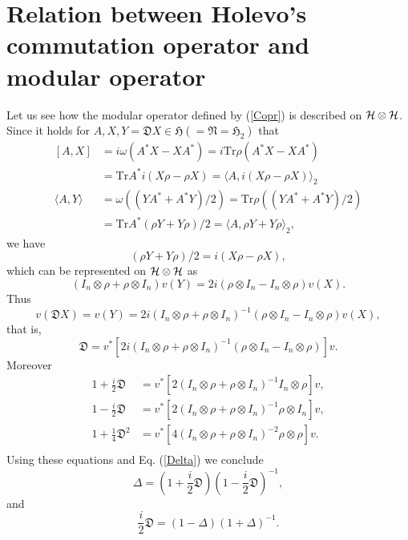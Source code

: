 \section{Relation between Holevo's commutation operator and modular operator}

Let us see how the modular operator defined by  (\ref{Copr}) is described on $\cal{H}\otimes \cal{H}$.
Since it holds for $A,X,Y=\mathfrak{D}X\in \mathfrak{H}(=\mathfrak{N}=\mathfrak{H}_2)$
that 
 \begin{equation}
 \begin{split}
 [A,X]&=i\omega(A^\ast X-XA^\ast)=i\mbox{Tr}\rho(A^\ast X-XA^\ast)\\
      &=\mbox{Tr}A^\ast i(X\rho-\rho X)=\langle A, i(X\rho-\rho X)\rangle_2\\
 \langle A,Y\rangle&=\omega((YA^\ast+A^\ast Y)/2)=\mbox{Tr}\rho((YA^\ast+A^\ast Y)/2)\\
 &=\mbox{Tr}A^\ast(\rho Y+Y\rho)/2=\langle A, \rho Y+Y\rho \rangle_2,
 \end{split}
 \end{equation}
  we have
 $$
 (\rho Y+Y\rho)/2=i(X\rho-\rho X),
 $$
 which can be represented on $\cal{H}\otimes \cal{H}$ as
	$$
	(I_n\otimes \rho + \rho\otimes I_n)v(Y)=2i(\rho\otimes I_n -I_n\otimes \rho )v(X).
	$$
	Thus 
	$$
	v(\mathfrak{D}X)=v(Y)=2i(I_n\otimes \rho + \rho\otimes I_n)^{-1}(\rho\otimes I_n -I_n\otimes \rho )v(X),
	$$
	that is,
	$$
	\mathfrak{D}=v^\ast[ 2i(I_n\otimes \rho + \rho\otimes I_n)^{-1}(\rho\otimes I_n -I_n\otimes \rho )]v.
	$$
	  Moreover
	\begin{equation}  
		\begin{split}
    1+\frac{i}{2}\mathfrak{D}&=v^\ast [ 2(I_n\otimes \rho+\rho\otimes I_n)^{-1}  I_n\otimes \rho]v,\\
    1-\frac{i}{2}\mathfrak{D}&=v^\ast [ 2(I_n\otimes \rho+\rho\otimes I_n)^{-1}\rho \otimes I_n]v,\\
    1+\frac{1}{4}\mathfrak{D}^2&=v^\ast[ 4(I_n\otimes \rho+\rho\otimes I_n)^{-2}\rho \otimes \rho]v.\\
    \end{split}
	\end{equation}
Using these equations and Eq. (\ref{Delta})  we conclude
		$$
    \Delta=\left(1+\frac{i}{2}\mathfrak{D}\right)\left(1-\frac{i}{2}\mathfrak{D}\right)^{-1},
		$$
		and
		$$
     \frac{i}{2}\mathfrak{D}=(1-\Delta)(1+\Delta)^{-1}.
		$$

